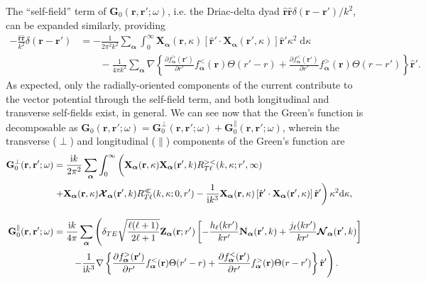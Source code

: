 \documentclass{article}
\begin{document}
The ``self-field'' term of $\mathbf{G}_0(\mathbf{r},\mathbf{r}';\omega)$, i.e. the Driac-delta dyad $\hat{\mathbf{r}}\hat{\mathbf{r}}\delta(\mathbf{r} - \mathbf{r}')/k^2$, can be expanded similarly, providing
\begin{equation}
\begin{split}
-\frac{\hat{\mathbf{r}}\hat{\mathbf{r}}}{k^2}\delta(\mathbf{r} - \mathbf{r}') &= -\frac{1}{2\pi^2k^2}\sum_{\bm{\alpha}}\int_0^\infty\mathbf{X}_{\bm{\alpha}}(\mathbf{r},\kappa)\left[\hat{\mathbf{r}}'\cdot\mathbf{X}_{\bm{\alpha}}(\mathbf{r}',\kappa)\right]\hat{\mathbf{r}}'\kappa^2\;\mathrm{d}\kappa\\
&\qquad-\frac{1}{4\pi k^2}\sum_{\bm{\alpha}}\nabla\left\{\frac{\partial f_{\bm{\alpha}}^>(\mathbf{r}')}{\partial r'}f_{\bm{\alpha}}^<(\mathbf{r})\Theta(r' - r) + \frac{\partial f_{\bm{\alpha}}^<(\mathbf{r}')}{\partial r'}f_{\bm{\alpha}}^>(\mathbf{r})\Theta(r - r')\right\}\hat{\mathbf{r}}'.
\end{split}
\end{equation}
As expected, only the radially-oriented components of the current contribute to the vector potential through the self-field term, and both longitudinal and transverse self-fields exist, in general. We can see now that the Green's function is decomposable as $\mathbf{G}_0(\mathbf{r},\mathbf{r}';\omega) = \mathbf{G}_0^\perp(\mathbf{r},\mathbf{r}';\omega) + \mathbf{G}_0^\parallel(\mathbf{r},\mathbf{r}';\omega)$, wherein the transverse ($\perp$) and longitudinal ($\parallel$) components of the Green's function are
\begin{equation}\label{eq:helmholtzDecompositionFreeSpaceGreenFunction}
\begin{split}
\mathbf{G}_0^\perp(\mathbf{r},\mathbf{r}';\omega) &= \frac{\mathrm{i}k}{2\pi^2}\sum_{\bm{\alpha}}\int_0^\infty\left( \vphantom{\frac{1}{4\pi k^2}} \mathbf{X}_{\bm{\alpha}}(\mathbf{r},\kappa)\mathbf{X}_{\bm{\alpha}}(\mathbf{r}',k)R_{T\ell}^{><}(k,\kappa;r',\infty)\right.\\
&\left.+ \mathbf{X}_{\bm{\alpha}}(\mathbf{r},\kappa)\bm{\mathcal{X}}_{\bm{\alpha}}(\mathbf{r}',k)R_{T\ell}^\ll(k,\kappa;0,r') - \frac{1}{\mathrm{i} k^3}\mathbf{X}_{\bm{\alpha}}(\mathbf{r},\kappa)\left[\hat{\mathbf{r}}'\cdot\mathbf{X}_{\bm{\alpha}}(\mathbf{r}',\kappa)\right]\hat{\mathbf{r}}'\right)\kappa^2\mathrm{d}\kappa,\\[1.0em]
\mathbf{G}_0^\parallel(\mathbf{r},\mathbf{r}';\omega) &= \frac{\mathrm{i}k}{4\pi}\sum_{\bm{\alpha}}\left(\delta_{TE}\sqrt{\frac{\ell(\ell + 1)}{2\ell + 1}}\mathbf{Z}_{\bm{\alpha}}(\mathbf{r};r')\left[-\frac{h_\ell(kr')}{kr'}\mathbf{N}_{\bm{\alpha}}(\mathbf{r}',k) + \frac{j_\ell(kr')}{kr'}\bm{\mathcal{N}}_{\bm{\alpha}}(\mathbf{r}',k)\right]\right.\\
&\left.\qquad-\frac{1}{\mathrm{i} k^3}\nabla\left\{\frac{\partial f_{\bm{\alpha}}^>(\mathbf{r}')}{\partial r'}f_{\bm{\alpha}}^<(\mathbf{r})\Theta(r' - r) + \frac{\partial f_{\bm{\alpha}}^<(\mathbf{r}')}{\partial r'}f_{\bm{\alpha}}^>(\mathbf{r})\Theta(r - r')\right\}\hat{\mathbf{r}}' \vphantom{\sqrt{\frac{\ell(\ell + 1)}{2\ell + 1}}} \right).
\end{split}
\end{equation}
\end{document}
